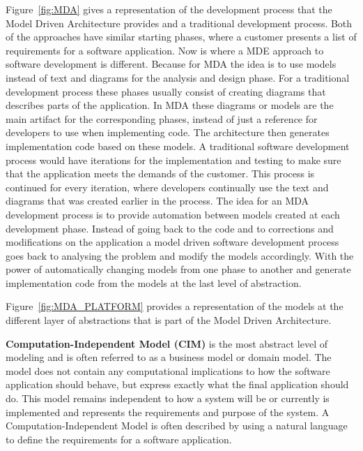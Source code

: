 Figure~\ref{fig:MDA} gives a representation of the development process that the
Model Driven Architecture provides and a traditional development process. Both
of the approaches have similar starting phases, where a customer presents a
list of requirements for a software application. Now is where a MDE approach to
software development is different. Because for MDA the idea is to use models
instead of text and diagrams for the analysis and design phase. For a
traditional development process these phases usually consist of creating
diagrams that describes parts of the application. In MDA these diagrams or
models are the main artifact for the corresponding phases, instead of just a
reference for developers to use when implementing code. The architecture then
generates implementation code based on these models. A traditional software
development process would have iterations for the implementation and testing to
make sure that the application meets the demands of the customer. This process
is continued for every iteration, where developers continually use the text and
diagrams that was created earlier in the process. The idea for an MDA
development process is to provide automation between models created at each
development phase. Instead of going back to the code and to corrections and
modifications on the application a model driven software development process
goes back to analysing the problem and modify the models accordingly. With the
power of automatically changing models from one phase to another and generate
implementation code from the models at the last level of abstraction.

Figure~\ref{fig:MDA_PLATFORM} provides a representation of the models at the
different layer of abstractions that is part of the Model Driven Architecture. 

\textbf{Computation-Independent Model (CIM)} is the most abstract level of
modeling and is often referred to as a business model or domain model. The
model does not contain any computational implications to how the software
application should behave, but express exactly what the final application
should do. This model remains independent to how a system will be or currently
is implemented and represents the requirements and purpose of the system. A
Computation-Independent Model is often described by using a natural language to
define the requirements for a software application. 


